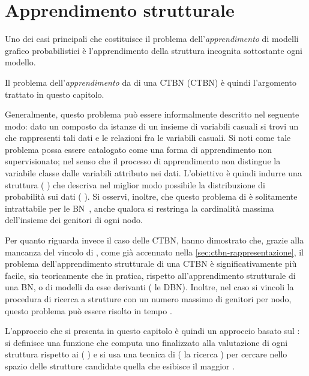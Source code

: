 
\chapter{Apprendimento strutturale}
\label{cap:structurallearning}
Uno dei casi principali che costituisce il problema dell'\emph{apprendimento} di modelli grafico probabilistici è l'apprendimento della struttura incognita sottostante ogni modello.

Il problema dell'\emph{apprendimento } da \emph{} di una \acl{CTBN} (\acs{CTBN}) è quindi l'argomento trattato in questo capitolo.

Generalmente, questo problema può essere informalmente descritto nel seguente modo: dato un \emph{\keyword{\trs{}}} composto da istanze di un insieme di variabili casuali si trovi un  che rappresenti tali dati e le relazioni fra le variabili casuali. Si noti come tale problema possa essere catalogato come una forma di apprendimento non supervisionato; nel senso che il processo di apprendimento non distingue la variabile classe dalle variabili attributo nei dati. L'obiettivo è quindi indurre una struttura (\ie{} ) che descriva nel miglior modo possibile la distribuzione di probabilità sui dati (\ie{} \emph{\keyword{\trs{}}}). Si osservi, inoltre, che questo problema di  è solitamente intrattabile per le \acl{BN}~\citep{Chickering1994,Chickering2004}, anche qualora si restringa la cardinalità massima dell'insieme dei genitori di ogni nodo.

Per quanto riguarda invece il caso delle \acs{CTBN}, \citet{Nodelman2002} hanno dimostrato che, grazie alla mancanza del vincolo di , come già accennato nella \autoref{sec:ctbn-rappresentazione}, il problema dell'apprendimento strutturale di una \acs{CTBN} è significativamente più facile, sia teoricamente che in pratica, rispetto all'apprendimento strutturale di una \acl{BN}, o di modelli da esse derivanti (\eg{} le \acf{DBN}). Inoltre, nel caso si vincoli la procedura di ricerca a strutture con un numero massimo di genitori per nodo, questo problema può essere risolto in tempo .

L'approccio che si presenta in questo capitolo è quindi un approccio basato sul : si definisce una funzione che computa uno \emph{} finalizzato alla valutazione di ogni struttura rispetto ai  (\ie{} \emph{\keyword{\trs{}}}) e si usa una tecnica di  (\eg{} la ricerca \emph{\keyword{\hc{}}}) per cercare nello spazio delle strutture candidate quella che esibisce il maggior .


